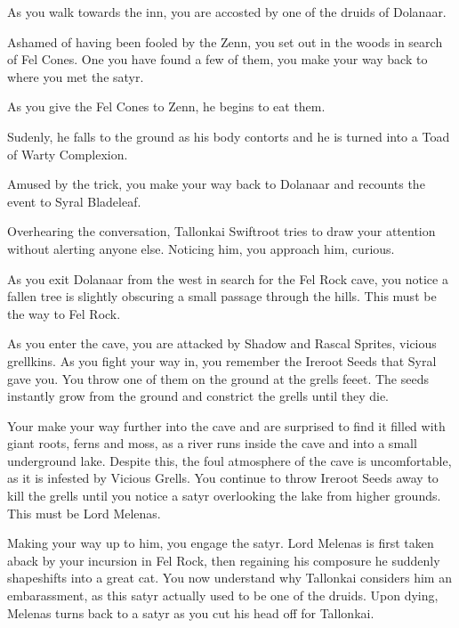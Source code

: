 As you walk towards the inn, you are accosted by one of the druids of Dolanaar.


Ashamed of having been fooled by the Zenn, you set out in the woods in search of Fel Cones. One you have found a few of them, you make your way back to where you met the satyr.


As you give the Fel Cones to Zenn, he begins to eat them.


Sudenly, he falls to the ground as his body contorts and he is turned into a Toad of Warty Complexion.


Amused by the trick, you make your way back to Dolanaar and recounts the event to Syral Bladeleaf.


Overhearing the conversation, Tallonkai Swiftroot tries to draw your attention without alerting anyone else. Noticing him, you approach him, curious.


As you exit Dolanaar from the west in search for the Fel Rock cave, you notice a fallen tree is slightly obscuring a small passage through the hills. This must be the way to Fel Rock.

As you enter the cave, you are attacked by Shadow and Rascal Sprites, vicious grellkins. As you fight your way in, you remember the Ireroot Seeds that Syral gave you. You throw one of them on the ground at the grells feeet. The seeds instantly grow from the ground and constrict the grells until they die.

Your make your way further into the cave and are surprised to find it filled with giant roots, ferns and moss, as a river runs inside the cave and into a small underground lake. Despite this, the foul atmosphere of the cave is uncomfortable, as it is infested by Vicious Grells. You continue to throw Ireroot Seeds away to kill the grells until you notice a satyr overlooking the lake from higher grounds. This must be Lord Melenas.

Making your way up to him, you engage the satyr. Lord Melenas is first taken aback by your incursion in Fel Rock, then regaining his composure he suddenly shapeshifts into a great cat. You now understand why Tallonkai considers him an embarassment, as this satyr actually used to be one of the druids. Upon dying, Melenas turns back to a satyr as you cut his head off for Tallonkai.

